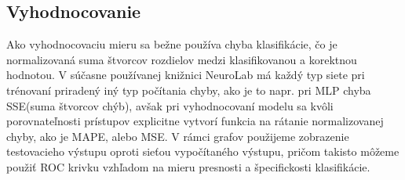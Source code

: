 \documentclass{iitsrc}
\begin{document}
\begin{multicols}{2}
\section{Vyhodnocovanie}
%
Ako vyhodnocovaciu mieru sa bežne používa chyba klasifikácie, čo je normalizovaná suma štvorcov rozdielov medzi klasifikovanou a korektnou hodnotou. V súčasne používanej knižnici NeuroLab má každý typ siete pri trénovaní priradený iný typ počítania chyby, ako je to napr. pri MLP chyba SSE(suma štvorcov chýb), avšak pri vyhodnocovaní modelu sa kvôli porovnateľnosti prístupov explicitne vytvorí funkcia na rátanie normalizovanej chyby, ako je MAPE, alebo MSE.
%
V rámci grafov použijeme zobrazenie testovacieho výstupu oproti sieťou vypočítaného výstupu, pričom takisto môžeme použiť ROC krivku vzhľadom na mieru presnosti a špecifickosti klasifikácie.

\let\OLDthebibliography\thebibliography
\renewcommand\thebibliography[1]{
  \OLDthebibliography{#1}
  \setlength{\parskip}{5pt}
 \footnotesize
}




\end{multicols}
\end{document}
